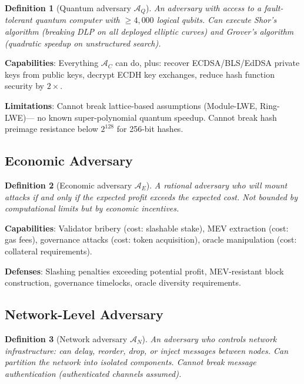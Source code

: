 \documentclass[11pt,a4paper]{article}
\newtheorem{definition}{Definition}[section]
\begin{document}
\begin{definition}[Quantum adversary $\mathcal{A}_Q$]
An adversary with access to a fault-tolerant quantum computer with $\geq 4{,}000$
logical qubits. Can execute Shor's algorithm (breaking DLP on all deployed elliptic
curves) and Grover's algorithm (quadratic speedup on unstructured search).
\end{definition}

\textbf{Capabilities}: Everything $\mathcal{A}_C$ can do, plus: recover ECDSA/BLS/EdDSA
private keys from public keys, decrypt ECDH key exchanges, reduce hash function
security by $2\times$.

\textbf{Limitations}: Cannot break lattice-based assumptions (Module-LWE, Ring-LWE)---
no known super-polynomial quantum speedup. Cannot break hash preimage resistance
below $2^{128}$ for 256-bit hashes.

\subsection{Economic Adversary}

\begin{definition}[Economic adversary $\mathcal{A}_E$]
A rational adversary who will mount attacks if and only if the expected profit exceeds
the expected cost. Not bounded by computational limits but by economic incentives.
\end{definition}

\textbf{Capabilities}: Validator bribery (cost: slashable stake), MEV extraction
(cost: gas fees), governance attacks (cost: token acquisition), oracle manipulation
(cost: collateral requirements).

\textbf{Defenses}: Slashing penalties exceeding potential profit, MEV-resistant
block construction, governance timelocks, oracle diversity requirements.

\subsection{Network-Level Adversary}

\begin{definition}[Network adversary $\mathcal{A}_N$]
An adversary who controls network infrastructure: can delay, reorder, drop, or
inject messages between nodes. Can partition the network into isolated components.
Cannot break message authentication (authenticated channels assumed).
\end{definition}
\end{document}
